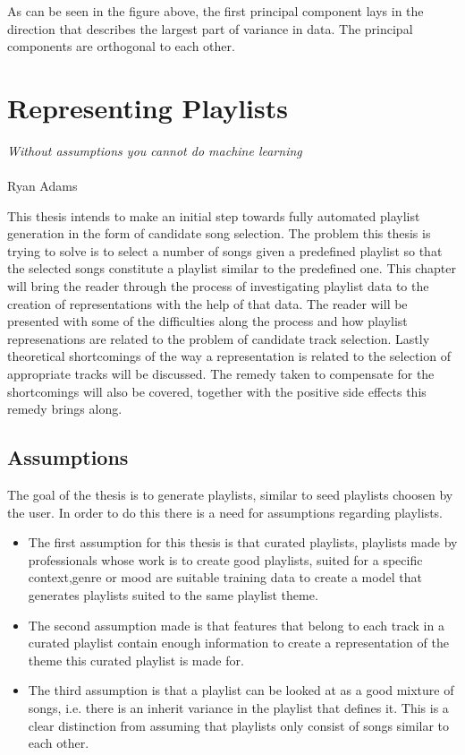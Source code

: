 \documentclass[a4paper,11pt]{kth-mag}
\begin{document}
As can be seen in the figure above, the first principal component lays in the direction that describes the largest part of variance in data. The principal components are orthogonal to each other. 

\chapter{Representing Playlists}
\begin{displayquote}
\textit{Without assumptions you cannot do machine learning} \\\\Ryan Adams
\end{displayquote}

This thesis intends to make an initial step towards fully automated playlist generation in the form of candidate song selection. The problem this thesis is trying to solve is to select a number of songs given a predefined playlist so that the selected songs constitute a playlist similar to the predefined one. This chapter will bring the reader through the process of investigating playlist data to the creation of representations with the help of that data. The reader will  be presented with some of the difficulties along the process and how playlist represenations are related to the problem of candidate track selection. Lastly theoretical shortcomings of the way a representation is related to the selection of appropriate tracks will be discussed. The remedy taken to compensate for the shortcomings will also be covered, together with the positive side effects this remedy brings along.

\section{Assumptions}
The goal of the thesis is to generate playlists, similar to seed playlists choosen by the user. In order to do this there is a need for assumptions regarding playlists.

\begin{itemize}


\item The first assumption for this thesis is that curated playlists, playlists made by professionals whose work is to create good playlists, suited for a specific context,genre or mood are suitable training data to create a model that generates playlists suited to the same playlist theme.

\item The second assumption made is that features that belong to each track in a curated playlist contain enough information to create a representation of the theme this curated playlist is made for.

\item The third assumption is that a playlist can be looked at as a good mixture of songs, i.e. there is an inherit variance in the playlist that defines it. This is a clear distinction from assuming that playlists only consist of songs similar to each other.

\end{itemize}
 
\end{document}

